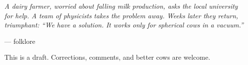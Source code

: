 \thispagestyle{empty}
\vspace*{\fill}
\begin{center}
\begin{minipage}{0.78\linewidth}
\itshape
A dairy farmer, worried about falling milk production, asks the local university for help.
A team of physicists takes the problem away. Weeks later they return, triumphant:
``We have a solution. It works only for spherical cows in a vacuum.''
\par\medskip
\upshape\hfill --- folklore
\end{minipage}
\end{center}
\vspace*{\fill}
\begin{center}
\small\color{gray}
This is a draft. Corrections, comments, and better cows are welcome.
\end{center}
\clearpage
